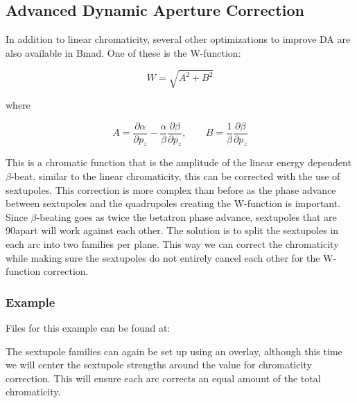 \documentclass{hitec}     %
\begin{document}
{{{{%
\subsection{Advanced Dynamic Aperture Correction}

In addition to linear chromaticity, several other optimizations to improve DA are also available in Bmad. One of these is the W-function:

\begin{equation}
    W=\sqrt{A^2+B^2}
\end{equation}

where

\begin{equation}
    A=\frac{\partial\alpha}{\partial p_z}-\frac{\alpha}{\beta}\frac{\partial\beta}{\partial p_z}, \;\;\;\;\;\;\;    B=\frac{1}{\beta}\frac{\partial\beta}{\partial p_z}
\end{equation}

This is a chromatic function that is the amplitude of the linear energy dependent $\beta$-beat. similar to the linear chromaticity, this can be corrected with the use of sextupoles. This correction is more complex than before as the phase advance between sextupoles and the quadrupoles creating the W-function is important. Since $\beta$-beating goes as twice the betatron phase advance, sextupoles that are 90\degree apart will work against each other. The solution is to split the sextupoles in each arc into two families per plane. This way we can correct the chromaticity while making sure the sextupoles do not entirely cancel each other for the W-function correction. 

\subsubsection{Example}

Files for this example can be found at: \\ 

The sextupole families can again be set up using an overlay, although this time we will center the sextupole strengths around the value for chromaticity correction. This will ensure each arc corrects an equal amount of the total chromaticity. 

}}}}
\end{document}

